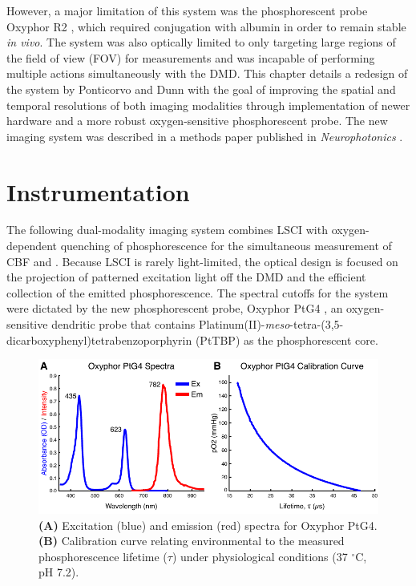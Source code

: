 However, a major limitation of this system was the phosphorescent probe Oxyphor R2 \cite{Dunphy:2002tz}, which required conjugation with albumin in order to remain stable \textit{in vivo}. The system was also optically limited to only targeting large regions of the field of view (FOV) for  measurements and was incapable of performing multiple actions simultaneously with the DMD. This chapter details a redesign of the system by Ponticorvo and Dunn \cite{Ponticorvo:2010uv} with the goal of improving the spatial and temporal resolutions of both imaging modalities through implementation of newer hardware and a more robust oxygen-sensitive phosphorescent probe. The new imaging system was described in a methods paper published in \textit{Neurophotonics} \cite{Sullender:2018ff}.



\section{Instrumentation}

The following dual-modality imaging system combines LSCI with oxygen-dependent quenching of phosphorescence for the simultaneous measurement of CBF and . Because LSCI is rarely light-limited, the optical design is focused on the projection of patterned excitation light off the DMD and the efficient collection of the emitted phosphorescence. The spectral cutoffs for the system were dictated by the new phosphorescent probe, Oxyphor PtG4 \cite{Esipova:2011hi}, an oxygen-sensitive dendritic probe that contains Platinum(II)-\textit{meso}-tetra-(3,5-dicarboxyphenyl)tetrabenzoporphyrin (PtTBP) as the phosphorescent core.

\begin{figure}
    \includegraphics{figures/chapter_2/oxyphorptg4.pdf}
    \caption{
        \label{fig:oxyphor_ptg4}
        \textbf{(A)} Excitation (blue) and emission (red) spectra for Oxyphor PtG4. \textbf{(B)} Calibration curve relating environmental  to the measured phosphorescence lifetime ($\tau$) under physiological conditions (37 $^\circ$C, pH 7.2).
    }
\end{figure}

